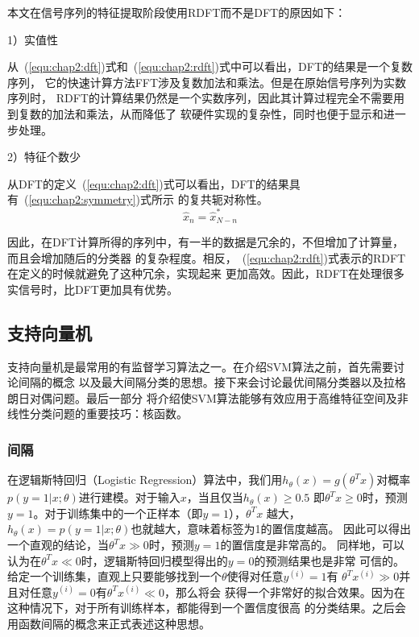 本文在信号序列的特征提取阶段使用RDFT而不是DFT的原因如下：

1）实值性

从~(\ref{equ:chap2:dft})式和~(\ref{equ:chap2:rdft})式中可以看出，DFT的结果是一个复数序列，
它的快速计算方法FFT涉及复数加法和乘法。但是在原始信号序列为实数序列时，
RDFT的计算结果仍然是一个实数序列，因此其计算过程完全不需要用到复数的加法和乘法，从而降低了
软硬件实现的复杂性，同时也便于显示和进一步处理。

2）特征个数少

从DFT的定义~(\ref{equ:chap2:dft})式可以看出，DFT的结果具有~(\ref{equ:chap2:symmetry})式所示
的复共轭对称性。
\begin{equation}
\label{equ:chap2:symmetry}
  \hat{x}_n = \hat{x}^*_{N-n}
\end{equation}

因此，在DFT计算所得的序列中，有一半的数据是冗余的，不但增加了计算量，而且会增加随后的分类器
的复杂程度。相反，~(\ref{equ:chap2:rdft})式表示的RDFT在定义的时候就避免了这种冗余，实现起来
更加高效。因此，RDFT在处理很多实信号时，比DFT更加具有优势。

\subsection{支持向量机}

支持向量机是最常用的有监督学习算法之一。在介绍SVM算法之前，首先需要讨论间隔的概念
以及最大间隔分类的思想。接下来会讨论最优间隔分类器以及拉格朗日对偶问题。最后一部分
将介绍使SVM算法能够有效应用于高维特征空间及非线性分类问题的重要技巧：核函数。

\subsubsection{间隔}

在逻辑斯特回归（Logistic Regression）算法中，我们用$h_{\theta}(x) = g(\theta^Tx)$对概率
$p(y = 1|x;\theta)$进行建模。对于输入$x$，当且仅当$h_{\theta}(x) \geq 0.5$
即$\theta^Tx \geq 0$时，预测$y = 1$。对于训练集中的一个正样本（即$y = 1$），$\theta^Tx$
越大，$h_{\theta}(x) = p(y = 1|x;\theta)$也就越大，意味着标签为1的置信度越高。
因此可以得出一个直观的结论，当$\theta^Tx \gg 0$时，预测$y = 1$的置信度是非常高的。
同样地，可以认为在$\theta^Tx \ll 0$时，逻辑斯特回归模型得出的$y = 0$的预测结果也是非常
可信的。给定一个训练集，直观上只要能够找到一个$\theta$使得对任意$y^{(i)} = 1$有
$\theta^Tx^{(i)} \gg 0$并且对任意$y^{(i)} = 0$有$\theta^Tx^{(i)} \ll 0$，那么将会
获得一个非常好的拟合效果。因为在这种情况下，对于所有训练样本，都能得到一个置信度很高
的分类结果。之后会用函数间隔的概念来正式表述这种思想。

